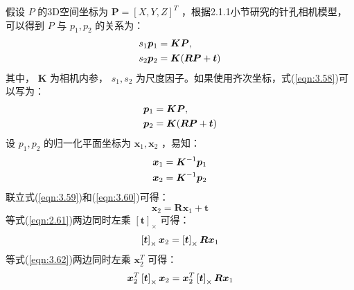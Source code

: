 假设 $P$ 的3D空间坐标为 $\boldsymbol{P}=[X, Y, Z]^{T} $ ，根据2.1.1小节研究的针孔相机模型，可以得到 $P$ 与 $p_1,p_2 $ 的关系为：
\begin{equation}
\label{eqn:3.58}
\setlength{\abovedisplayskip}{6pt}
\setlength{\belowdisplayskip}{6pt}
\begin{aligned}
s_{1} \boldsymbol{p}_{1} &= \boldsymbol{K} \boldsymbol{P},  \\
s_{2} \boldsymbol{p}_{2} &= \boldsymbol{K}(\boldsymbol{R} \boldsymbol{P}+\boldsymbol{t})
\end{aligned}
\end{equation}
其中， $\bm{K} $ 为相机内参， $s_1,s_2 $ 为尺度因子。如果使用齐次坐标，式(\ref{eqn:3.58})可以写为：
\begin{equation}
\label{eqn:3.59}
\setlength{\abovedisplayskip}{6pt}
\setlength{\belowdisplayskip}{6pt}
\begin{aligned}
\boldsymbol{p}_{1} &= \boldsymbol{K} \boldsymbol{P},  \\
\boldsymbol{p}_{2} &= \boldsymbol{K}(\boldsymbol{R} \boldsymbol{P}+\boldsymbol{t})
\end{aligned}
\end{equation}
设 $p_1,p_2 $ 的归一化平面坐标为 $\boldsymbol{x}_{1}, \boldsymbol{x}_{2} $ ，易知：
\begin{equation}
\label{eqn:3.60}
\setlength{\abovedisplayskip}{6pt}
\setlength{\belowdisplayskip}{6pt}
\begin{aligned}
\boldsymbol{x}_{1} &=\boldsymbol{K}^{-1} \boldsymbol{p}_{1} \\
\boldsymbol{x}_{2} &=\boldsymbol{K}^{-1} \boldsymbol{p}_{2}
\end{aligned}
\end{equation}
联立式(\ref{eqn:3.59})和(\ref{eqn:3.60})可得：
\begin{equation}
\label{eqn:3.61}
\boldsymbol{x}_{2}=\boldsymbol{R} \boldsymbol{x}_{1}+\boldsymbol{t}
\end{equation}
等式(\ref{eqn:2.61})两边同时左乘 $\left[\bm{t}\right]_\times $ 可得：
\begin{equation}
\label{eqn:3.62}
\setlength{\abovedisplayskip}{6pt}
\setlength{\belowdisplayskip}{6pt}
\left[\boldsymbol{t}\right]_\times \boldsymbol{x}_{2}= \left[\boldsymbol{t}\right]_\times  \boldsymbol{R} \boldsymbol{x}_{1}
\end{equation}
等式(\ref{eqn:3.62})两边同时左乘 $\bm{x}_{2}^{T} $ 可得：
\begin{equation}
\label{eqn:3.63}
\setlength{\abovedisplayskip}{6pt}
\setlength{\belowdisplayskip}{6pt}
\boldsymbol{x}_{2}^{T} \left[\boldsymbol{t}\right]_\times \boldsymbol{x}_{2}=
\boldsymbol{x}_{2}^{T} \left[\boldsymbol{t}\right]_\times \boldsymbol{R} \boldsymbol{x}_{1}
\end{equation}

